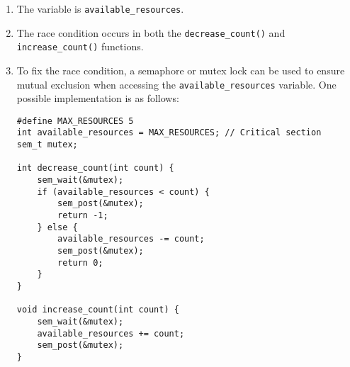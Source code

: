 \documentclass{article}
\def\c#1{\texttt{#1}}
\begin{document}
\begin{enumerate}
	\item The variable is \c{available\_resources}.

	\item The race condition occurs in both the \c{decrease\_count()} and \c{increase\_count()} functions.

	\item To fix the race condition, a semaphore or mutex lock can be used to ensure mutual exclusion when accessing the \c{available\_resources} variable. One possible implementation is as follows:

	      \begin{lstlisting}[style=cstyle]
#define MAX_RESOURCES 5
int available_resources = MAX_RESOURCES; // Critical section
sem_t mutex;

int decrease_count(int count) {
    sem_wait(&mutex);
    if (available_resources < count) {
        sem_post(&mutex);
        return -1;
    } else {
        available_resources -= count;
        sem_post(&mutex);
        return 0;
    }
}

void increase_count(int count) {
    sem_wait(&mutex);
    available_resources += count;
    sem_post(&mutex);
}
\end{lstlisting}
\end{enumerate}
\end{document}
